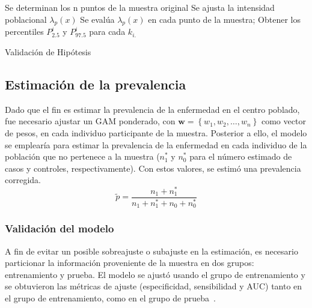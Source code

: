 \newpage

\begin{algorithm}[H]\label{validaHipo}
	Se determinan los n puntos de la muestra original \;
	Se ajusta la intensidad poblacional $\lambda_p(x)$ \;
	Se evalúa $\lambda_p(x)$ en cada punto de la muestra;
	Obtener los percentiles $P^{i}_{2.5}$ y $P^{i}_{97.5}$ para cada $k_{i.}$ \;
	\caption{Validación de Hipótesis}
\end{algorithm}


\newpage

\subsection{Estimación de la prevalencia}
Dado que el fin es estimar la prevalencia de la enfermedad en el centro poblado, fue necesario ajustar un GAM ponderado, con $\textbf{w}=\left\{w_1,w_2,\dots,w_n \right\}$ como vector de pesos, en cada individuo participante de la muestra. Posterior a ello, el modelo se emplearía para estimar la prevalencia de la enfermedad en cada individuo de la población que no pertenece a la muestra ($n^*_1$ y $n^*_0$ para el número estimado de casos y controles, respectivamente). Con estos valores, se estimó una prevalencia corregida.
\begin{equation}
	\tilde{p} = \frac{n_1 + n^*_1}{n_1 + n^*_1 + n_0 + n^*_0}
\end{equation}

\subsubsection{Validación del modelo}
A fin de evitar un posible sobreajuste o subajuste en la estimación, es necesario particionar la información proveniente de la muestra en dos grupos: entrenamiento y prueba. El modelo se ajustó usando el grupo de entrenamiento y se obtuvieron las métricas de ajuste (especificidad, sensibilidad y AUC) tanto en el grupo de entrenamiento, como en el grupo de prueba~\cite{friedman2001elements}.

